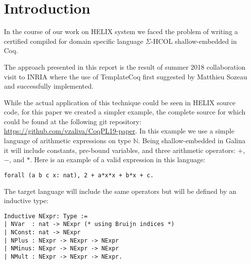 \documentclass[sigplan]{acmart}\settopmatter{printfolios=true,printccs=false,printacmref=false}
\newcommand{\N}{\mathbb{N}}
\begin{document}


\maketitle

\section{Introduction}

In the course of our work on HELIX system\cite{helixFHPC18} we faced
the problem of writing a certified compiled for domain specific
language $\Sigma$-HCOL shallow-embedded in Coq.

The approach presented in this report is the result of summer 2018
collaboration visit to INRIA where the use of
TemplateCoq\cite{anand2018towards} first suggested by Matthieu Sozeau
and successfully implemented.

While the actual application of this technique could be seen in HELIX
source code, for this paper we created a simpler example, the complete
source for which could be found at the following git repository:
\url{https://github.com/vzaliva/CoqPL19-paper}. In this example we use
a simple language of arithmetic expressions on type $\N$. Being
shallow-embedded in Galina it will include constants, pre-bound
variables, and three arithmetic operators: $+$, $-$, and $*$. Here is
an example of a valid expression in this language:

\begin{lstlisting}[language=Coq, mathescape=true,
  frame=single, basicstyle=\footnotesize,
  label=lst:oexp]
forall (a b c x: nat), 2 + a*x*x + b*x + c.
\end{lstlisting}

The target language will include the same operators but will be
defined by an inductive type:

\begin{lstlisting}[language=Coq, mathescape=true,
  frame=single,basicstyle=\footnotesize]
Inductive NExpr: Type :=
| NVar  : nat -> NExpr (* using Bruijn indices *)
| NConst: nat -> NExpr
| NPlus : NExpr -> NExpr -> NExpr
| NMinus: NExpr -> NExpr -> NExpr
| NMult : NExpr -> NExpr -> NExpr.
\end{lstlisting}
\end{document}
